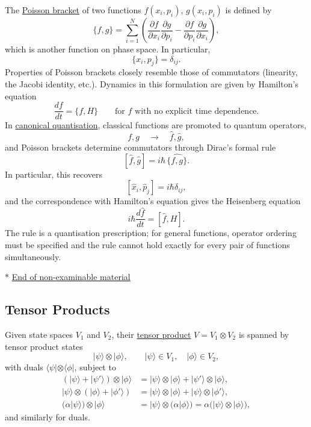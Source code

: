 \documentclass[11pt,a4paper]{article}
\begin{document}
The \underline{Poisson bracket} of two functions $f(x_i,p_i)$,
$g(x_i,p_i)$ is defined by
\[
    \{f,g\}=\sum_{i=1}^{N}\left(
        \frac{\partial f}{\partial x_i}\frac{\partial g}{\partial p_i}
        -\frac{\partial f}{\partial p_i}\frac{\partial g}{\partial x_i}
    \right),
\]
which is another function on phase space. In particular,
\[
    \{x_i,p_j\}=\delta_{ij}.
\]
Properties of Poisson brackets closely resemble those of commutators
(linearity, the Jacobi identity, etc.). Dynamics in this formulation are
given by Hamilton's equation
\[
    \frac{df}{dt}=\{f,H\}
    \qquad\text{for }f\text{ with no explicit time dependence.}
\]
In \underline{canonical quantisation}, classical functions are promoted
to quantum operators,
\[
    f,g\quad\longrightarrow\quad\hat{f},\hat{g},
\]
and Poisson brackets determine commutators through Dirac's formal rule
\[
    [\hat{f},\hat{g}]=i\hbar\,\widehat{\{f,g\}}.
\]
In particular, this recovers
\[
    [\hat{x}_i,\hat{p}_j]=i\hbar\delta_{ij},
\]
and the correspondence with Hamilton's equation gives the Heisenberg
equation
\[
    i\hbar\frac{d\hat{f}}{dt}=[\hat{f},H].
\]
The rule is a quantisation prescription; for general functions, operator
ordering must be specified and the rule cannot hold exactly for every
pair of functions simultaneously.

\noindent
$\ast$ \underline{End of non-examinable material}

\subsection*{Tensor Products}

Given state spaces $V_1$ and $V_2$, their \underline{tensor product}
$V=V_1\otimes V_2$ is spanned by tensor product states
\[
    |\psi\rangle\otimes|\phi\rangle,
    \qquad |\psi\rangle\in V_1,\quad |\phi\rangle\in V_2,
\]
with duals $\langle\psi|\otimes\langle\phi|$, subject to
\begin{align*}
    (|\psi\rangle+|\psi'\rangle)\otimes|\phi\rangle
        &=|\psi\rangle\otimes|\phi\rangle
          +|\psi'\rangle\otimes|\phi\rangle,\\
    |\psi\rangle\otimes(|\phi\rangle+|\phi'\rangle)
        &=|\psi\rangle\otimes|\phi\rangle
          +|\psi\rangle\otimes|\phi'\rangle,\\
    (\alpha|\psi\rangle)\otimes|\phi\rangle
        &=|\psi\rangle\otimes(\alpha|\phi\rangle)
          =\alpha\bigl(|\psi\rangle\otimes|\phi\rangle\bigr),
\end{align*}
and similarly for duals.
\end{document}
